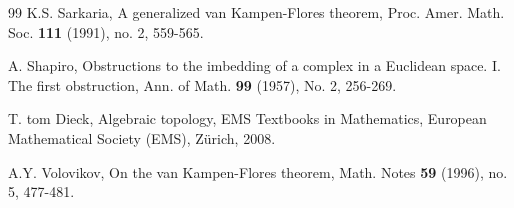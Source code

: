 \documentclass[amsfonts]{amsart}
\numberwithin{equation}{section}
\theoremstyle{definition}
\theoremstyle{remark}
\begin{document}
\begin{thebibliography}{99}
     K.S. Sarkaria, A generalized van Kampen-Flores theorem, Proc. Amer. Math. Soc. \textbf{111} (1991), no. 2, 559-565.

    A. Shapiro, Obstructions to the imbedding of a complex in a Euclidean space. I. The first obstruction, Ann. of Math. \textbf{99} (1957), No. 2, 256-269.

     T. tom Dieck, Algebraic topology, EMS Textbooks in Mathematics, European Mathematical Society (EMS), Z\"{u}rich, 2008.

     A.Y. Volovikov, On the van Kampen-Flores theorem, Math. Notes \textbf{59} (1996), no. 5, 477-481.

  \end{thebibliography}
\end{document}
